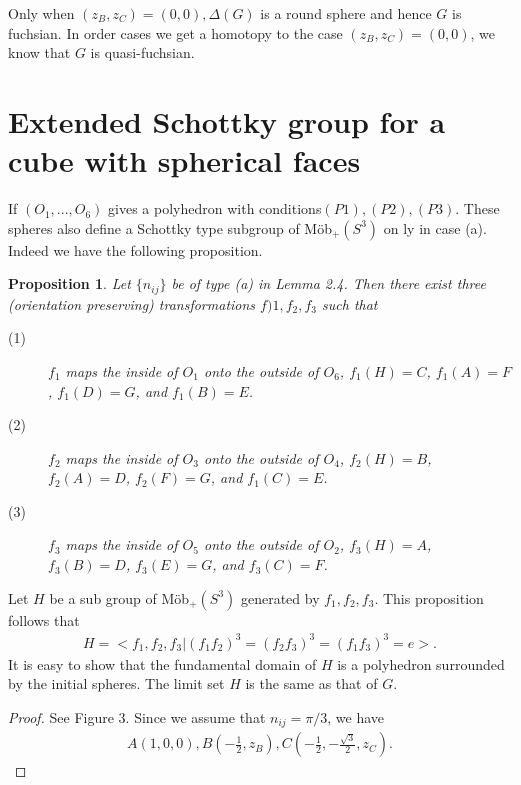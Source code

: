 \documentclass[dvipdfmx]{interact}
\theoremstyle{plain}%
\newtheorem{proposition}[theorem]{Proposition}
\theoremstyle{definition}
\theoremstyle{remark}
\theoremstyle{problemstyle}
\begin{document}
Only when $(z_B, z_C) =(0, 0), \Delta(G)$ is a round sphere and hence
$G$ is fuchsian. In order cases we get a homotopy to the case 
$(z_B, z_C) = (0, 0)$, we know that $G$ is quasi-fuchsian.

\section{Extended Schottky group for a cube with spherical faces}
If $(O_1, ..., O_6)$ gives a polyhedron with conditions$(P1), (P2),
(P3)$.
These spheres also define a Schottky type subgroup of M\"ob$_+(S^3)$ on
ly in case (a). Indeed we have the following  proposition.

\begin{proposition}
Let $\{n_{ij}\}$ be of type (a) in Lemma 2.4. Then there exist three
 (orientation preserving) transformations $f)1, f_2, f_3$ such that
 \begin{description}
  \item[(1)] $f_1$ maps the inside of $O_1$ onto the outside of
             $O_6$, $f_1(H) = C$, $f_1(A) = F$,  $f_1(D) = G$, and
             $f_1(B) = E$.
  \item[(2)] $f_2$ maps the inside of $O_3$ onto the outside of
             $O_4$, $f_2(H) = B$, $f_2(A) = D$,  $f_2(F) = G$, and
             $f_1(C) = E$.             
  \item[(3)] $f_3$ maps the inside of $O_5$ onto the outside of
             $O_2$, $f_3(H) = A$, $f_3(B) = D$,  $f_3(E) = G$, and
             $f_3(C) = F$.
\end{description}
\end{proposition}

Let $H$ be a sub group of M\"ob$_+(S^3)$ generated by $f_1, f_2,
f_3$. This proposition follows that
\begin{align*}
 H = <f_1, f_2, f_3|(f_1f_2)^3 = (f_2f_3)^3 = (f_1f_3)^3 = e>.
\end{align*}
It is easy to show that the fundamental domain of $H$ is a polyhedron
surrounded by the initial spheres. The limit set $H$ is the same as that
of $G$.

\begin{proof}
See Figure 3. Since we assume that $n_{ij} = \pi/3$, we have
\begin{align*}
 A(1, 0, 0), B(-\frac{1}{2}, z_B), C(-\frac{1}{2}, -\frac{\sqrt{3}}{2}, z_C).
\end{align*}
\end{proof}
\end{document}
